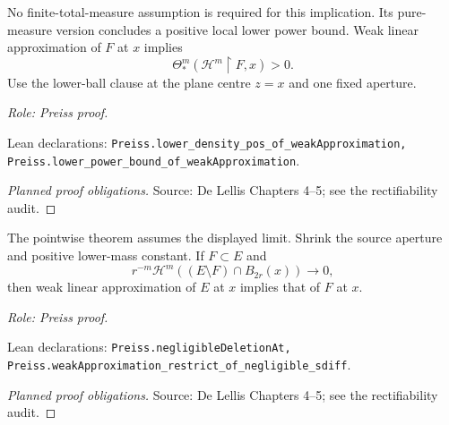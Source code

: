 \begin{lemma}
\label{lem:weak-approximation-lower-density}








No finite-total-measure assumption is required for this implication. Its pure-measure version concludes a positive local lower power bound.
Weak linear approximation of \(F\) at \(x\) implies
\[
 \Theta_*^m(\mathcal H^m\!\restriction F,x)>0.
\]
Use the lower-ball clause at the plane centre \(z=x\) and one fixed aperture.
\par\emph{Role: Preiss proof.}
\par Lean declarations: \texttt{Preiss.lower\_density\_pos\_of\_weakApproximation, Preiss.lower\_power\_bound\_of\_weakApproximation}.
\end{lemma}
\begin{proof}[Planned proof obligations]
\par Source: De Lellis Chapters 4--5; see the rectifiability audit.
\end{proof}

\begin{lemma}
\label{lem:weak-approximation-deletion}








The pointwise theorem assumes the displayed limit. Shrink the source aperture and positive lower-mass constant.
If \(F\subset E\) and
\[
 r^{-m}\mathcal H^m((E\setminus F)\cap B_{2r}(x))\longrightarrow0,
\]
then weak linear approximation of \(E\) at \(x\) implies that of \(F\) at \(x\).
\par\emph{Role: Preiss proof.}
\par Lean declarations: \texttt{Preiss.negligibleDeletionAt, Preiss.weakApproximation\_restrict\_of\_negligible\_sdiff}.
\end{lemma}
\begin{proof}[Planned proof obligations]
\par Source: De Lellis Chapters 4--5; see the rectifiability audit.
\end{proof}

